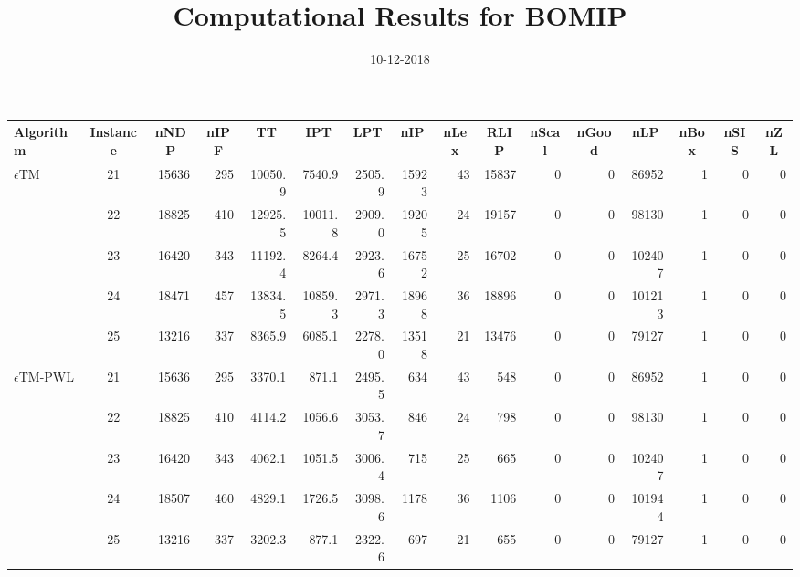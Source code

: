 \documentclass{article}
\title{Computational Results for BOMIP}
\date{10-12-2018}
\begin{document}
\maketitle

\begin{table}[htb]
	\scriptsize
	\centering
	
	\setlength{\tabcolsep}{0.8pt}
	\begin{tabular}{l|c|rr|rrr|rrrrrr|rrr}
		
		\noalign{\smallskip}
		\firsthline
		\noalign{\smallskip}
		
		\textbf{Algorithm} & \textbf{Instance} & \multicolumn{1}{c}{\textbf{nNDP}} & \multicolumn{1}{c|}{\textbf{nIPF}} 
		
		& \multicolumn{1}{c}{\textbf{TT}} & \multicolumn{1}{c}{\textbf{IPT}} & \multicolumn{1}{c|}{\textbf{LPT}} &  \multicolumn{1}{c}{\textbf{nIP}} & \multicolumn{1}{c}{\textbf{nLex}} & \multicolumn{1}{c}{\textbf{RLIP}} & \multicolumn{1}{c}{\textbf{nScal}} & \multicolumn{1}{c}{\textbf{nGood}}
		
		& \multicolumn{1}{c|}{\textbf{nLP}} & \multicolumn{1}{c}{\textbf{nBox}} &  \multicolumn{1}{c}{\textbf{nSIS}} & \multicolumn{1}{c}{\textbf{nZL}}  \\ \hline
		
	
\hline
$\epsilon$TM & 21 & 15636 & 295 & 10050.9 & 7540.9 & 2505.9 &  15923 & 43 & 15837 & 0 & 0 & 86952 & 1 & 0 & 0 \\
& 22 & 18825 & 410 & 12925.5 & 10011.8 & 2909.0 &  19205 & 24 & 19157 & 0 & 0 & 98130 & 1 & 0 & 0 \\
& 23 & 16420 & 343 & 11192.4 & 8264.4 & 2923.6 &  16752 & 25 & 16702 & 0 & 0 & 102407 & 1 & 0 & 0 \\
& 24 & 18471 & 457 & 13834.5 & 10859.3 & 2971.3 &  18968 & 36 & 18896 & 0 & 0 & 101213 & 1 & 0 & 0 \\
& 25 & 13216 & 337 & 8365.9 & 6085.1 & 2278.0 &  13518 & 21 & 13476 & 0 & 0 & 79127 & 1 & 0 & 0 \\

\hline
$\epsilon$TM-PWL & 21 & 15636 & 295 & 3370.1 & 871.1 & 2495.5 &  634 & 43 & 548 & 0 & 0 & 86952 & 1 & 0 & 0  \\
& 22 & 18825 & 410 & 4114.2 & 1056.6 & 3053.7 &  846 & 24 & 798 & 0 & 0 & 98130 & 1 & 0 & 0  \\
& 23 & 16420 & 343 & 4062.1 & 1051.5 & 3006.4 &  715 & 25 & 665 & 0 & 0 & 102407 & 1 & 0 & 0  \\
& 24 & 18507 & 460 & 4829.1 & 1726.5 & 3098.6 &  1178 & 36 & 1106 & 0 & 0 & 101944 & 1 & 0 & 0 \\
& 25 & 13216 & 337 & 3202.3 & 877.1 & 2322.6 &  697 & 21 & 655 & 0 & 0 & 79127 & 1 & 0 & 0  \\


\end{tabular}
\end{table}
\end{document}
